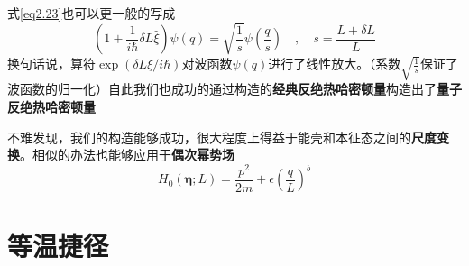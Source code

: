 式\ref{eq2.23}也可以更一般的写成
\begin{equation}
    \left(1+\frac{1}{i \hbar} \delta L \hat{\xi}\right) \psi(q)=\sqrt{\frac{1}{s}} \psi\left(\frac{q}{s}\right) \quad, \quad s=\frac{L+\delta L}{L}
    \label{eq2.25}
\end{equation}
换句话说，算符$\exp (\delta L \xi / i \hbar)$对波函数$\psi(q)$进行了线性放大。（系数$\sqrt{\frac{1}{s}}$保证了波函数的归一化）自此我们也成功的通过构造的\textbf{经典反绝热哈密顿量}构造出了\textbf{量子反绝热哈密顿量}

不难发现，我们的构造能够成功，很大程度上得益于能壳和本征态之间的\textbf{尺度变换}。相似的办法也能够应用于\textbf{偶次幂势场}
\begin{equation}
    H_{0}(\bm{\eta} ; L)=\frac{p^{2}}{2 m}+\epsilon\left(\frac{q}{L}\right)^{b}
    \label{eq2.26}
\end{equation}




















\section{等温捷径}
    


